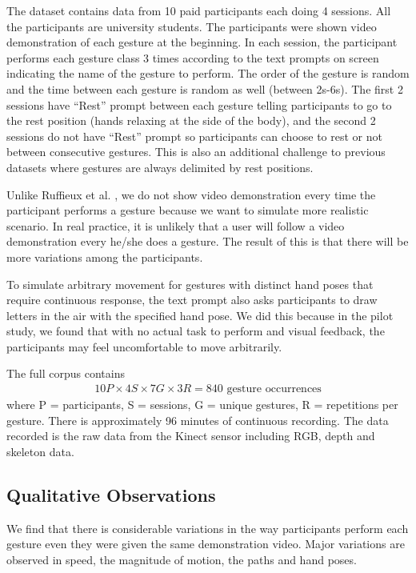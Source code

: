 \documentclass[conference]{IEEEtran}
\begin{document}
The dataset contains data from 10 paid participants each
doing 4 sessions. All the participants are university students.
The participants were shown video demonstration of each gesture at the beginning. In each
session, the participant performs each gesture class 3 times according to the
text prompts on screen indicating the name of the gesture to perform.
The order of the gesture is random and the time between each gesture is random
as well (between 2s-6s). The first 2 sessions have ``Rest'' prompt between each
gesture telling participants to go to the rest position (hands relaxing at the side of
the body), and the second 2 sessions do not have ``Rest'' prompt so participants
can choose to rest or not between consecutive gestures. This is also an
additional challenge to previous datasets \cite{Ruffieux2013} where gestures are always
delimited by rest positions.

Unlike Ruffieux et al. \cite{Ruffieux2013}, we do not show video demonstration
every time the participant performs a gesture because we want to simulate more
realistic scenario. In real practice, it is unlikely that a user will follow a
video demonstration every he/she does a gesture. The result of this is that
there will be more variations among the participants.

To simulate arbitrary movement for gestures with distinct hand poses that
require continuous response, the text prompt also asks participants to draw
letters in the air with the specified hand pose. We did this because in the
pilot study, we found that with no actual task to perform and visual feedback,
the participants may feel uncomfortable to move arbitrarily.

The full corpus contains 
\begin{align*}
10P \times 4S \times 7G \times 3R = 840 \text{ gesture occurrences}
\end{align*}
where P = participants, S = sessions, G = unique gestures, R = repetitions per
gesture. There is approximately 96 minutes of continuous recording. The data
recorded is the raw data from the Kinect sensor including RGB, depth and
skeleton data.

\subsection{Qualitative Observations}
We find that there is considerable variations in the way participants perform
each gesture even they were given the same demonstration video. Major variations
are observed in speed, the magnitude of motion, the paths and hand poses.
\end{document}
